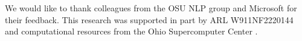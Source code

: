 We would like to thank colleagues from the OSU NLP group and Microsoft for their feedback.
This research was supported in part by ARL W911NF2220144 and computational resources from the Ohio Supercomputer Center \cite{center1987ohio}.